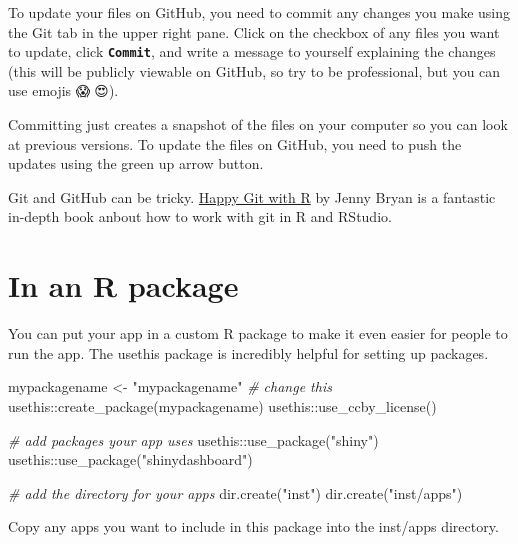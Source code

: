 \documentclass[
  oneside]{book}
\newenvironment{Shaded}{\begin{snugshade}}{\end{snugshade}}
\newcommand{\CommentTok}[1]{\textcolor[rgb]{0.56,0.35,0.01}{\textit{#1}}}
\newcommand{\FunctionTok}[1]{\textcolor[rgb]{0.00,0.00,0.00}{#1}}
\newcommand{\NormalTok}[1]{#1}
\newcommand{\OtherTok}[1]{\textcolor[rgb]{0.56,0.35,0.01}{#1}}
\newcommand{\SpecialCharTok}[1]{\textcolor[rgb]{0.00,0.00,0.00}{#1}}
\newcommand{\StringTok}[1]{\textcolor[rgb]{0.31,0.60,0.02}{#1}}
\begin{document}
To update your files on GitHub, you need to commit any changes you make using the Git tab in the upper right pane. Click on the checkbox of any files you want to update, click \textbf{\texttt{Commit}}, and write a message to yourself explaining the changes (this will be publicly viewable on GitHub, so try to be professional, but you can use emojis 😱🤪😍).

Committing just creates a snapshot of the files on your computer so you can look at previous versions. To update the files on GitHub, you need to push the updates using the green up arrow button.

\begin{info}
Git and GitHub can be tricky. \href{https://happygitwithr.com/}{Happy Git with R} by Jenny Bryan is a fantastic in-depth book anbout how to work with git in R and RStudio.

\end{info}

\hypertarget{in-an-r-package}{%
\section{In an R package}\label{in-an-r-package}}

You can put your app in a custom R package to make it even easier for people to run the app. The usethis package is incredibly helpful for setting up packages.

\begin{Shaded}
\begin{Highlighting}[]
\NormalTok{mypackagename }\OtherTok{\textless{}{-}} \StringTok{"mypackagename"} \CommentTok{\# change this}
\NormalTok{usethis}\SpecialCharTok{::}\FunctionTok{create\_package}\NormalTok{(mypackagename)}
\NormalTok{usethis}\SpecialCharTok{::}\FunctionTok{use\_ccby\_license}\NormalTok{()}

\CommentTok{\# add packages your app uses}
\NormalTok{usethis}\SpecialCharTok{::}\FunctionTok{use\_package}\NormalTok{(}\StringTok{"shiny"}\NormalTok{)}
\NormalTok{usethis}\SpecialCharTok{::}\FunctionTok{use\_package}\NormalTok{(}\StringTok{"shinydashboard"}\NormalTok{)}

\CommentTok{\# add the directory for your apps}
\FunctionTok{dir.create}\NormalTok{(}\StringTok{"inst"}\NormalTok{)}
\FunctionTok{dir.create}\NormalTok{(}\StringTok{"inst/apps"}\NormalTok{)}
\end{Highlighting}
\end{Shaded}

Copy any apps you want to include in this package into the inst/apps directory.
\end{document}

